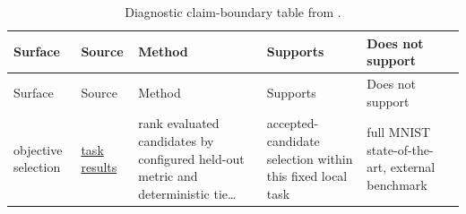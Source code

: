 \documentclass[
]{article}
\begin{document}
\begin{longtable}[]{@{}
  >{\raggedright\arraybackslash}p{}
  >{\raggedright\arraybackslash}p{}
  >{\raggedright\arraybackslash}p{}
  >{\raggedright\arraybackslash}p{}
  >{\raggedright\arraybackslash}p{}@{}}
\caption{Diagnostic claim-boundary table from
\protect{}.}\label{tbl:diagnostic-boundary}\tabularnewline
\toprule\noalign{}
\begin{minipage}[b]{\linewidth}\raggedright
Surface
\end{minipage} & \begin{minipage}[b]{\linewidth}\raggedright
Source
\end{minipage} & \begin{minipage}[b]{\linewidth}\raggedright
Method
\end{minipage} & \begin{minipage}[b]{\linewidth}\raggedright
Supports
\end{minipage} & \begin{minipage}[b]{\linewidth}\raggedright
Does not support
\end{minipage} \\
\midrule\noalign{}
\endfirsthead
\toprule\noalign{}
\begin{minipage}[b]{\linewidth}\raggedright
Surface
\end{minipage} & \begin{minipage}[b]{\linewidth}\raggedright
Source
\end{minipage} & \begin{minipage}[b]{\linewidth}\raggedright
Method
\end{minipage} & \begin{minipage}[b]{\linewidth}\raggedright
Supports
\end{minipage} & \begin{minipage}[b]{\linewidth}\raggedright
Does not support
\end{minipage} \\
\midrule\noalign{}
\endhead
\bottomrule\noalign{}
\endlastfoot
objective selection & \href{../data/ml_task_results.json}{task results}
& rank evaluated candidates by configured held-out metric and
deterministic tie\ldots{} & accepted-candidate selection within this
fixed local task & full MNIST state-of-the-art, external benchmark

\end{longtable}
\end{document}
